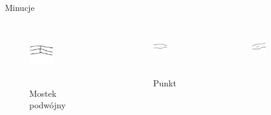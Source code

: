 \documentclass{beamer}
\begin{document}
\begin{frame}{Minucje}
    \begin{columns}
            \begin{figure}[t]
			    \centering
                \includegraphics[width=0.4\textwidth]{fingerprints/minucje/mostek2.jpg}\\~\
                 \caption*{Mostek podwójny}
            \end{figure}
		    \begin{figure}[t]
			    \centering
                \includegraphics[width=0.4\textwidth]{fingerprints/minucje/punkt.jpg}\\~\
                \caption*{Punkt}
            \end{figure}
            \begin{figure}[t]
			    \centering
                \includegraphics[width=0.4\textwidth]{fingerprints/minucje/odcinek.jpg}\\~\

\end{figure}
\end{columns}
\end{frame}
\end{document}
